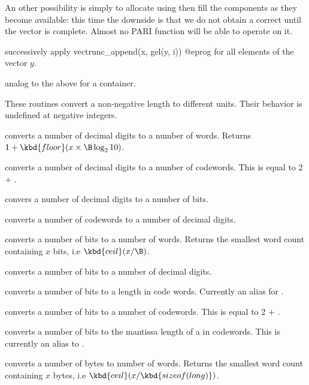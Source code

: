An other possibility is simply to allocate using  then fill
the components as they become available: this time the downside is that we do
not obtain a correct  until the vector is complete. Almost no PARI
function will be able to operate on it.

 successively apply
\bprog
  vectrunc_append(x, gel(y, i))
@eprog
for all elements of the vector $y$.


 analog to the above for a
 container.


These routines convert a non-negative length to different units. Their
behavior is undefined at negative integers.

 converts a number of decimal digits to a number
of words. Returns $ 1 + \kbd{floor}(x \times \B \log_2 10)$.

 converts a number of decimal digits to a number
of codewords. This is equal to 2 + .

 convers a number of decimal digits to a
number of bits.

 converts a number of codewords to a
number of decimal digits.

 converts a number of bits to a number of
words. Returns the smallest word count containing $x$ bits, i.e $
\kbd{ceil}(x / \B)$.

 converts a number of bits to a number of
decimal digits.

 converts a number of bits to a length
in code words. Currently  an alias for .

 converts a number of bits to a number of
codewords. This is equal to 2 + .

 converts a number of bits to the mantissa
length of a  in codewords. This is currently an alias to
.

 converts a number of bytes to number of
words. Returns the smallest word count containing $x$ bytes, i.e
$\kbd{ceil}(x / \kbd{sizeof(long)})$.

